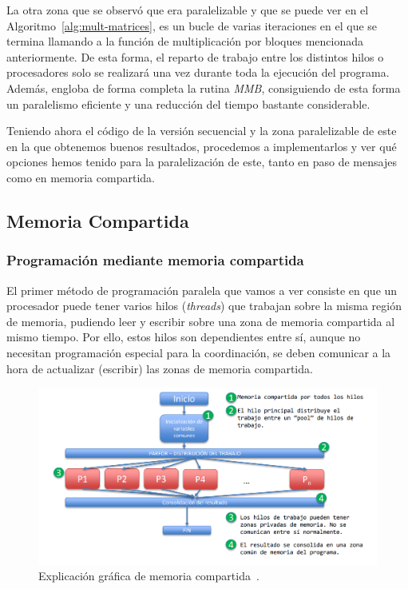 \documentclass[a4paper,12pt]{article}
\begin{document}
La otra zona que se observó que era paralelizable y que se puede ver en el  Algoritmo~\ref{alg:mult-matrices}, es un bucle de varias iteraciones en el que se termina llamando a la función de multiplicación por bloques mencionada anteriormente. De esta forma, el reparto de trabajo entre los distintos hilos o procesadores solo se realizará una vez durante toda la ejecución del programa. Además, engloba de forma completa la rutina {\it MMB}, consiguiendo de esta forma un paralelismo eficiente y una reducción del tiempo bastante considerable.

Teniendo ahora el código de la versión secuencial y la zona paralelizable de este en la que obtenemos buenos resultados, procedemos a implementarlos y ver qué opciones hemos tenido para la paralelización de este, tanto en paso de mensajes como en memoria compartida.

\subsection{Memoria Compartida}
\subsubsection{Programación mediante memoria compartida}
El primer método de programación paralela que vamos a ver consiste en que un procesador puede tener varios hilos ({\it threads}) que trabajan sobre la misma región de memoria, pudiendo leer y escribir sobre una zona de memoria compartida al mismo tiempo. Por ello, estos hilos son dependientes entre sí, aunque no necesitan programación especial para la coordinación, se deben comunicar a la hora de actualizar (escribir) las zonas de memoria compartida.


\begin{figure}[htbp]
    \includegraphics[scale=0.65]{./images/2.1.arte-omp.PNG}
    \centering
    \caption{Explicación gráfica de memoria compartida~\cite{icmat}.}
    \label{fig:arte-omp}
\end{figure}
\end{document}
